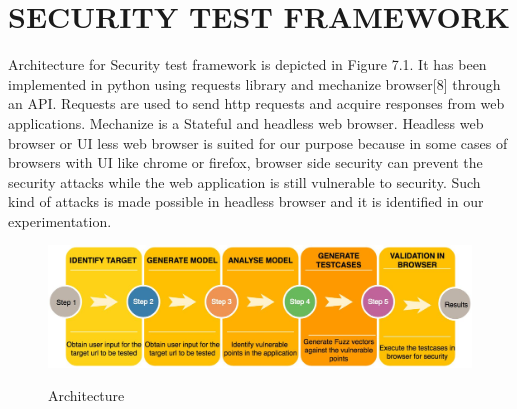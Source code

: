 
\chapter{SECURITY TEST FRAMEWORK}

Architecture for Security test framework is depicted in Figure 7.1. It has been implemented in python using requests library and mechanize browser[8] through an API. Requests are used to send http requests and acquire responses from web applications. Mechanize is a Stateful and headless web browser. Headless web browser or UI less web browser is suited for our purpose because in some cases of browsers with UI like chrome or firefox, browser side security can prevent the security attacks while the web application is still vulnerable to security. Such kind of attacks is made possible in headless browser and it is identified in our experimentation. 

\begin{figure}[htpb]
 \begin{center}
    \resizebox{150mm}{50mm} {\includegraphics {Chapters/architecture1.eps}}
    \caption {Architecture}
  \label{fig:Table}
 \end{center}
\end{figure}

